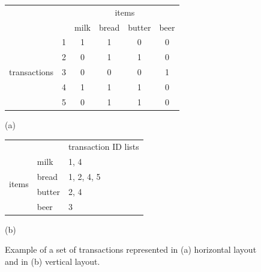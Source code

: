\documentclass[10pt,a4paper]{article}
\begin{document}
\begin{figure}[tp]
\centering

\begin{minipage}[b]{.4\linewidth}
\renewcommand{\arraystretch}{1.1}
\setlength{\tabcolsep}{2mm}
%
\begin{center}
\begin{tabular}{cl|cccc}
& & \multicolumn{4}{c}{items}\\

& & milk & bread & butter & beer \\
\cline{2-6}
\multirow{5}{*}{\begin{sideways} transactions \end{sideways}}

& 1 		& 1 & 1 & 0 & 0 \\
& 2 	  	& 0 & 1 & 1 & 0 \\
& 3 		& 0 & 0 & 0 & 1 \\
& 4 		& 1 & 1 & 1 & 0 \\
& 5 		& 0 & 1 & 1 & 0 \\
\end{tabular}

\vspace{1cm}
(a)
\end{center}
\end{minipage}
%
\hspace{.1\linewidth}
%
\begin{minipage}[b]{.4\linewidth}
\renewcommand{\arraystretch}{1.1}
\setlength{\tabcolsep}{2mm}
%
\begin{center}
\begin{tabular}{cl|l}
& & \multicolumn{1}{c}{transaction ID lists}\\

\cline{2-3}
\multirow{4}{*}{\begin{sideways} items \end{sideways}}

& milk  		& 1, 4 \\
& bread  		& 1, 2, 4, 5 \\
& butter 		& 2, 4 \\
& beer  		& 3 \\
\end{tabular}

\vspace{1.5cm}
(b)
\end{center}
\end{minipage}

\caption{Example of a set of transactions represented in 
    (a) horizontal layout and in 
    (b) vertical layout.\label{fig:transactionMatrix}}
\end{figure}
\end{document}
